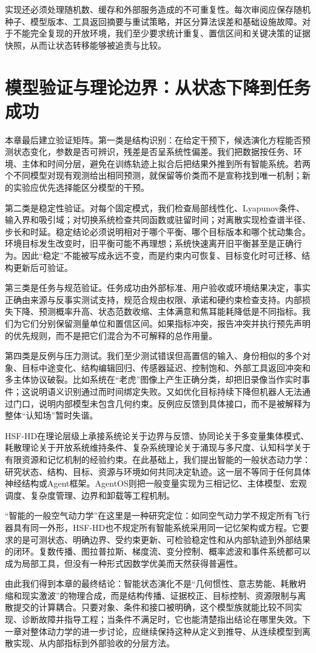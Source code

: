 实现还必须处理随机数、缓存和外部服务造成的不可重复性。每次审阅应保存随机种子、模型版本、工具返回摘要与重试策略，并区分算法误差和基础设施故障。对于不能完全复现的开放环境，我们至少要求统计重复、置信区间和关键决策的证据快照，从而让状态转移能够被追责与比较。

\section{模型验证与理论边界：从状态下降到任务成功}
\label{sec:evolution_validation}

本章最后建立验证矩阵。第一类是结构识别：在给定干预下，候选演化方程能否预测状态变化，参数是否可辨识，残差是否呈系统性偏差。我们把数据按任务、环境、主体和时间分层，避免在训练轨迹上拟合后把结果外推到所有智能系统。若两个不同模型对现有观测给出相同预测，就保留等价类而不是宣称找到唯一机制；新的实验应优先选择能区分模型的干预。

第二类是稳定性验证。对每个固定模式，我们检查局部线性化、Lyapunov条件、输入界和吸引域；对切换系统检查共同函数或驻留时间；对离散实现检查谱半径、步长和时延。稳定结论必须说明相对于哪个平衡、哪个目标版本和哪个扰动集合。环境目标发生改变时，旧平衡可能不再理想；系统快速离开旧平衡甚至是正确行为。因此“稳定”不能被写成永远不变，而是约束内可恢复、目标变化时可迁移、结构更新后可验证。

第三类是任务与规范验证。任务成功由外部标准、用户验收或环境结果决定，事实正确由来源与反事实测试支持，规范合规由权限、承诺和硬约束检查支持。内部损失下降、预测概率升高、状态范数收缩、主体满意和焦耳能耗降低是不同指标。我们为它们分别保留测量单位和置信区间。如果指标冲突，报告冲突并执行预先声明的优先规则，而不是把它们混合为不可解释的总作用量。

第四类是反例与压力测试。我们至少测试错误但高置信的输入、身份相似的多个对象、目标中途变化、结构编辑回归、传感器延迟、控制饱和、外部工具返回冲突和多主体协议破裂。比如系统在“老虎”图像上产生正确分类，却把旧录像当作实时事件；这说明语义识别通过而时间绑定失败。又如优化目标持续下降但机器人无法通过门口，说明内部模型未包含几何约束。反例应反馈到具体接口，而不是被解释为整体“认知场”暂时失谐。

HSF-HD在理论层级上承接系统论关于边界与反馈、协同论关于多变量集体模式、耗散理论关于开放系统维持条件、复杂系统理论关于涌现与多尺度、认知科学关于有限资源和记忆机制的经验约束。在此基础上，我们提出智能的一般状态动力学：研究状态、结构、目标、资源与环境如何共同决定轨迹。这一层不等同于任何具体神经结构或Agent框架。AgentOS则把一般变量实现为三相记忆、主体模型、宏观调度、复杂度管理、边界和卸载等工程机制。

“智能的一般空气动力学”在这里是一种研究定位：如同空气动力学不规定所有飞行器具有同一外形，HSF-HD也不规定所有智能系统采用同一记忆架构或方程。它要求的是可测状态、明确边界、受约束更新、可检验稳定性和从内部轨迹到外部结果的闭环。复数传播、图拉普拉斯、梯度流、变分控制、概率滤波和事件系统都可以成为局部工具，但没有一种形式因数学优美而天然获得普遍性。

由此我们得到本章的最终结论：智能状态演化不是“几何惯性、意志势能、耗散坍缩和现实激波”的物理合成，而是结构传播、证据校正、目标控制、资源限制与离散提交的计算耦合。只要对象、条件和接口被明确，这个模型族就能比较不同实现、诊断故障并指导工程；当条件不满足时，它也能清楚指出结论在哪里失效。下一章对整体动力学的进一步讨论，应继续保持这种从定义到推导、从连续模型到离散实现、从内部指标到外部验收的分层方法。
